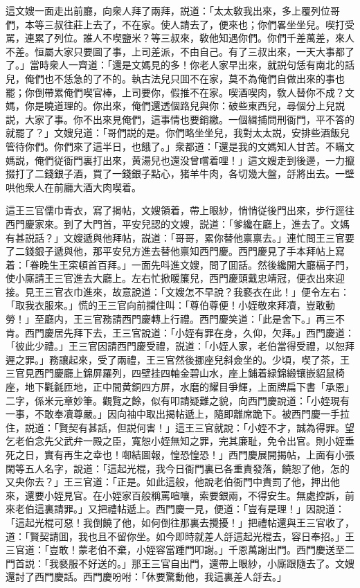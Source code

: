 這文嫂一面走出前廳，向衆人拜了兩拜，説道：「太太敎我出來，多上覆列位哥們，本等三叔往莊上去了，不在家。使人請去了，便來也；你們畧坐坐兒。喫打受駡，連累了列位。誰人不喫鹽米？等三叔來，敎他知遇你們。你們千差萬差，來人不差。恒屬大家只要圖了事，上司差派，不由自己。有了三叔出來，一天大事都了了。」當時衆人一齊道：「還是文媽見的多！你老人家早出來，就説句恁有南北的話兒，俺們也不恁急的了不的。執古法兒只囬不在家，莫不為俺們自做出來的事也罷；你倒帶累俺們喫官棒，上司要你，假推不在家。喫酒喫肉，敎人替你不成？文媽，你是曉道理的。你出來，俺們還透個路兒與你：破些東西兒，尋個分上兒説説，大家了事。你不出來見俺們，這事情也要銷繳。一個緝捕問刑衙門，平不答的就罷了？」文嫂兒道：「哥們説的是。你們略坐坐兒，我對太太説，安排些酒飯兒管待你們。你們來了這半日，也餓了。」衆都道：「還是我的文媽知人甘苦。不瞞文媽説，俺們従衙門裏打出來，黄湯兒也還没曾嚐着哩！」這文嫂走到後邊，一力攛掇打了二錢銀子酒，買了一錢銀子點心，猪羊牛肉，各切幾大盤，㧱將出去。一壁哄他衆人在前廳大酒大肉喫着。

這王三官儒巾青衣，寫了揭帖，文嫂領着，帶上眼紗，悄悄従後門出來，步行逕往西門慶家來。到了大門首，平安兒認的文嫂，説道：「爹纔在廳上，進去了。文媽有甚説話？」文嫂遞與他拜帖，説道：「哥哥，累你替他禀禀去。」連忙問王三官要了二錢銀子遞與他，那平安兒方進去替他禀知西門慶。西門慶見了手本拜帖上寫着：「眷晚生王寀頓首百拜。」一面先呌進文嫂，問了囬話。然後纔開大廳槅子門，使小廝請王三官進去大廳上。左右忙掀暖簾兒，西門慶頭戴忠靖冠，便衣出來迎接。見王三官衣巾進來，故意說道：「文嫂怎不早說？我褻衣在此！」便令左右：「取我衣服來。」慌的王三官向前攔住叫：「尊伯尊便！小姪敬來拜凟，豈敢動勞！」至廳内，王三官務請西門慶轉上行禮。西門慶笑道：「此是舍下。」再三不肯。西門慶居先拜下去，王三官說道：「小姪有罪在身，久仰，欠拜。」西門慶道：「彼此少禮。」王三官因請西門慶受禮，説道：「小姪人家，老伯當得受禮，以恕拜遲之罪。」務讓起來，受了兩禮，王三官然後挪座兒斜僉坐的。少頃，喫了茶，王三官見西門慶廳上錦屏羅列，四壁挂四軸金碧山水，座上鋪着緑錦緞镶嵌貂鼠椅座，地下氍毹匝地，正中間黄銅四方屏，水磨的耀目爭輝，上面牌扁下書「承恩」二字，係米元章妙筆。觀覽之餘，似有叩請疑難之貌，向西門慶說道：「小姪現有一事，不敢奉凟尊嚴。」因向袖中取出揭帖遞上，隨即離席跪下。被西門慶一手拉住，説道：「賢契有甚話，但説何害！」這王三官就說：「小姪不才，誠為得罪。望乞老伯念先父武弁一殿之臣，寬恕小姪無知之罪，完其廉耻，免令出官。則小姪垂死之日，實有再生之幸也！啣結圖報，惶恐惶恐！」西門慶展開揭帖，上面有小張閑等五人名字，說道：「這起光棍，我今日衙門裏已各重責發落，饒恕了他，怎的又央你去？」王三官道：「正是。如此這般，他說老伯衙門中責罰了他，押出他來，還要小姪見官。在小姪家百般稱罵喧嚷，索要銀兩，不得安生。無處控訴，前來老伯這裏請罪。」又把禮帖遞上。西門慶一見，便道：「豈有是理！」因說道：「這起光棍可惡！我倒饒了他，如何倒往那裏去攪擾！」把禮帖還與王三官收了，道：「賢契請囬，我也且不留你坐。如今即時就差人㧱這起光棍去，容日奉招。」王三官道：「豈敢！蒙老伯不棄，小姪容當踵門叩謝。」千恩萬謝出門。西門慶送至二門首説：「我褻服不好送的。」那王三官自出門，還帶上眼紗，小廝跟隨去了。文嫂還討了西門慶話。西門慶吩咐：「休要驚動他，我這裏差人㧱去。」

